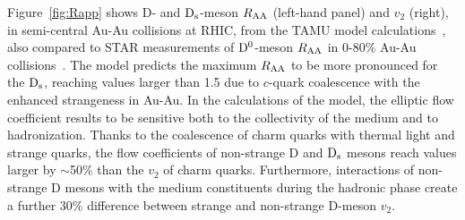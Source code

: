 Figure~\ref{fig:Rapp} shows D- and ${\rm D_s}$-meson $R_{\rm AA}$ (left-hand panel)
and $v_2$ (right), in semi-central Au-Au collisions at 
RHIC, from the TAMU model calculations~\cite{He:2012df}, also
compared to STAR measurements of ${\rm D^0}$-meson $R_{\rm AA}$ in 0-80\% Au-Au 
collisions~\cite{Zhang:2011uva}.
The model predicts the maximum $R_{\rm AA}$ to be more 
pronounced for the ${\rm D_s}$, reaching values larger than 1.5 due 
to $c$-quark coalescence with the enhanced strangeness in Au-Au.
In the calculations of the model, the elliptic flow coefficient results to be sensitive both 
to the collectivity of the medium and to hadronization. Thanks to the coalescence of charm quarks with 
thermal light and strange quarks, the flow coefficients of non-strange D and ${\rm D_s}$ mesons reach
values larger by $\sim$50\% than the $v_2$ of charm quarks. Furthermore, interactions of non-strange D mesons
with the medium constituents during the hadronic phase create a further 30\%
difference between strange and non-strange D-meson $v_2$.

